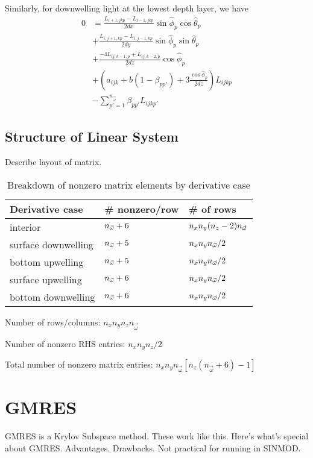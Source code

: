 Similarly, for downwelling light at the lowest depth layer, we have
\begin{equation}
  \begin{aligned}
    0 &= \frac{L_{i+1,jkp}-L_{i-1,jkp}}{2dx}\sin\hat{\phi}_p\cos\hat{\theta}_p \\
    &+ \frac{L_{i,j+1,kp}-L_{i,j-1,kp}}{2dy}\sin\hat{\phi}_p\sin\hat{\theta}_p \\
    &+ \frac{-4L_{ij,k-1,p} + L_{ij,k-2,p}}{2dz}\cos\hat{\phi}_p \\
    &+ \left(a_{ijk}+b(1-\beta_{pp'}) + 3\frac{\cos\hat\phi_p}{2dz} \right)L_{ijkp} \\
    &- \sum_{p'=1}^{n_{\vec{\omega}}} \beta_{pp'} L_{ijkp'}
  \end{aligned}
\end{equation}

\subsection{Structure of Linear System}

Describe layout of matrix.

\begin{table}[H]
  \centering
  \begin{tabular}{p{}p{}p{}}
    \toprule
    \textbf{Derivative case} & \textbf{\# nonzero/row} & \textbf{\# of rows} \\
    \midrule
    interior & ${n_{\vec{\omega}}}+6$ & $n_xn_y(n_z-2){n_{\vec{\omega}}}$ \\
    surface downwelling & ${n_{\vec{\omega}}}+5$ & $n_xn_y{n_{\vec{\omega}}}/2$ \\
    bottom upwelling & ${n_{\vec{\omega}}}+5$ & $n_xn_y{n_{\vec{\omega}}}/2$ \\
    surface upwelling & ${n_{\vec{\omega}}}+6$ & $n_xn_y{n_{\vec{\omega}}}/2$ \\
    bottom downwelling & ${n_{\vec{\omega}}}+6$ & $n_xn_y{n_{\vec{\omega}}}/2$ \\
  \end{tabular}
  \caption{Breakdown of nonzero matrix elements by derivative case}
\end{table}

Number of rows/columns: $n_xn_yn_zn_{\vec{\omega}}$

Number of nonzero RHS entries: $n_xn_yn_z/2$

Total number of nonzero matrix entries: $n_xn_yn_{\vec{\omega}} \left[n_z(n_{\vec{\omega}}+6)-1 \right]$

\section{GMRES}
GMRES is a Krylov Subspace method. These work like this. Here's what's special
about GMRES. Advantages. Drawbacks. Not practical for running in SINMOD.

